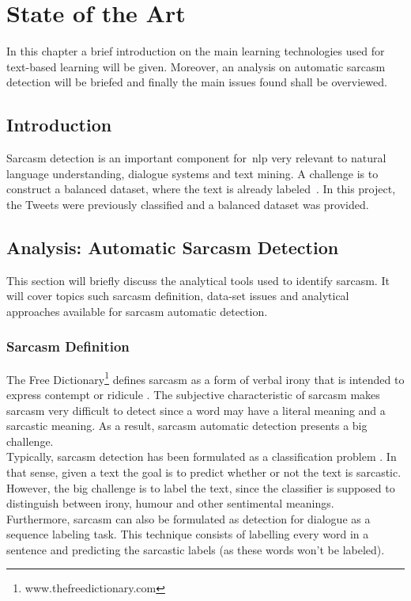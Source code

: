 \chapter{State of the Art}
\label{chap:enabling_technologies}
In this chapter a brief introduction on the main learning technologies used for text-based learning will be given. Moreover, an analysis on automatic sarcasm detection will be briefed and finally the main issues found shall be overviewed.

\section{Introduction}
Sarcasm detection is an important component for~\ac{nlp} very relevant to natural language understanding, dialogue systems and text mining. A challenge is to construct a balanced dataset, where the text is already labeled~\cite{khodak2017large}. In this project, the Tweets were previously classified and a balanced dataset was provided.
\section{Analysis: Automatic Sarcasm Detection}
This section will briefly discuss the analytical tools used to identify sarcasm. It will cover topics such sarcasm definition, data-set issues and analytical approaches available for sarcasm automatic detection. 
\subsection{Sarcasm Definition~\cite{joshi2017automatic}}
The Free Dictionary\footnote{www.thefreedictionary.com} defines sarcasm as a form of verbal irony that is intended to express contempt or ridicule . The subjective characteristic of sarcasm makes sarcasm very difficult to detect since a word may have a literal meaning and a sarcastic meaning. As a result, sarcasm automatic detection presents a big challenge. \\
Typically, sarcasm detection has been formulated as a classification problem . In that sense, given a text the goal is to predict whether or not the text is sarcastic. However, the big challenge is to label the text, since the classifier is supposed to distinguish between irony,  humour and other sentimental meanings.\\
Furthermore, sarcasm can also be formulated as detection for dialogue as a sequence labeling task. This technique consists of labelling every word in a sentence and predicting the sarcastic labels (as these words won't be labeled).

